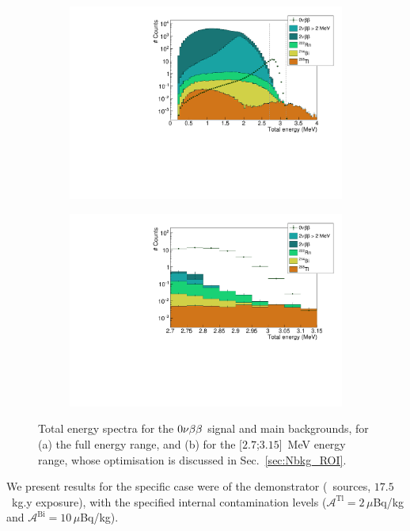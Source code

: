\begin{figure}[h]
\centering
\begin{subfigure}[t]{0.7\textwidth}
  \centering
  \includegraphics[width=1.1\textwidth]{Sensitivity/fig_sensitivity/energy_spectrum_with_B_82Se.pdf}
  \captionsetup{justification=centering}
  \caption{
    \label{subfig:energy_spectra_full}}
\end{subfigure}
\hfill
\begin{subfigure}[t]{0.7\textwidth}
  \centering
  \includegraphics[width=1.1\textwidth]{Sensitivity/fig_sensitivity/energy_spectrum_with_B_82Se_zoom.pdf}
  \captionsetup{justification=centering}
  \caption{
    \label{subfig:energy_spectra_zoom}}
\end{subfigure}
\caption{Total energy spectra for the $0\nu\beta\beta$ signal and main backgrounds, for (a) the full energy range, and (b) for the [$2.7$;$3.15$]~MeV energy range, whose optimisation is discussed in Sec.~\ref{sec:Nbkg_ROI}.
  \label{fig:energy_spectra}}
\end{figure}
We present results for the specific case were of the demonstrator (\Se\ sources, $17.5$~kg.y exposure), with the specified internal contamination levels ($\mathcal{A}^{\text{Tl}} = 2\,\mu$Bq/kg and $\mathcal{A}^{\text{Bi}} = 10\,\mu$Bq/kg).

